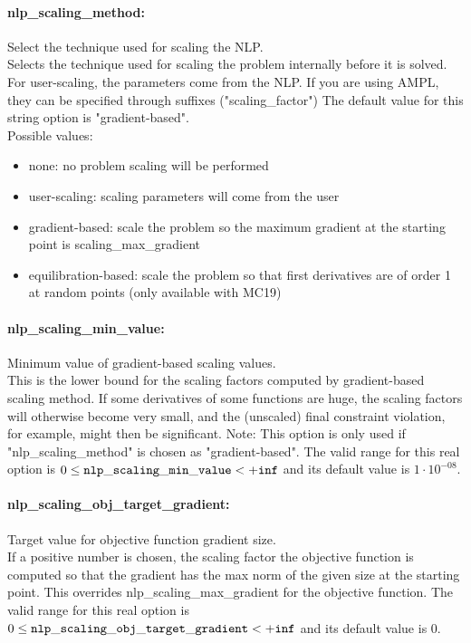 \paragraph{nlp\_scaling\_method:}\label{opt:nlp_scaling_method} Select the technique used for scaling the NLP. \\
 Selects the technique used for scaling the problem internally before it is solved. For user-scaling, the parameters come from the NLP. If you are using AMPL, they can be specified through suffixes ("scaling\_factor") The default value for this string option is "gradient-based".
\\ 
Possible values:
\begin{itemize}
   \item none: no problem scaling will be performed
   \item user-scaling: scaling parameters will come from the user
   \item gradient-based: scale the problem so the maximum gradient at the starting point is scaling\_max\_gradient
   \item equilibration-based: scale the problem so that first derivatives are of order 1 at random points (only available with MC19)
\end{itemize}

\paragraph{nlp\_scaling\_min\_value:}\label{opt:nlp_scaling_min_value} Minimum value of gradient-based scaling values. \\
 This is the lower bound for the scaling factors computed by gradient-based scaling method.  If some derivatives of some functions are huge, the scaling factors will otherwise become very small, and the (unscaled) final constraint violation, for example, might then be significant.  Note: This option is only used if "nlp\_scaling\_method" is chosen as "gradient-based". The valid range for this real option is 
$0 \le {\tt nlp\_scaling\_min\_value } <  {\tt +inf}$
and its default value is $1 \cdot 10^{-08}$.


\paragraph{nlp\_scaling\_obj\_target\_gradient:}\label{opt:nlp_scaling_obj_target_gradient} Target value for objective function gradient size. \\
 If a positive number is chosen, the scaling factor the objective function is computed so that the gradient has the max norm of the given size at the starting point.  This overrides nlp\_scaling\_max\_gradient for the objective function. The valid range for this real option is 
$0 \le {\tt nlp\_scaling\_obj\_target\_gradient } <  {\tt +inf}$
and its default value is $0$.


